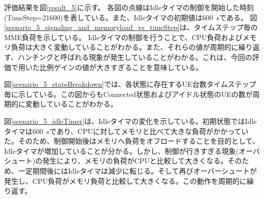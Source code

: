 \documentclass[a4j]{ujarticle}
\begin{document}
評価結果を図\ref{result_5}に示す。
各図の点線はIdleタイマの制御を開始した時刻(TimeStep=21600)を表している。また、Idleタイマの初期値は600~sである。
図\ref{scenario_5_signaling_and_memoryload_vs_timeStep}は、タイムステップ毎のMME負荷を示している。
Idleタイマの制御を行うことで、CPU負荷およびメモリ負荷は大きく変動していることがわかる。また、それらの値が周期的に繰り返す、ハンチングと呼ばれる現象が発生していることがわかる。これは、今回の評価で用いた比例ゲインの値が大きすぎることを意味している。

図\ref{scenario_5_stateBreakdown}では、各状態に存在するUE台数タイムステップ毎に示している。この図からもConnected状態およびアイドル状態のUEの数が周期的に変動していることがわかる。

図\ref{scenario_5_idleTimer}は、Idleタイマの変化を示している。初期状態ではIdleタイマは600~sであり、CPUに対してメモリと比べて大きな負荷がかかっていた。そのため、制御開始後はメモリへ負荷をオフロードすることを目的として、Idleタイマが増加していることが分かる。しかし、制御が行きすぎる現象(オーバシュート)の発生により、メモリの負荷がCPUと比較して大きくなる。そのため、一定期間後にはIdleタイマは減少に転じる。そして再びオーバーシュートが発生し、CPU負荷がメモリ負荷と比較して大きくなる。この動作を周期的に繰り返す。
\end{document}
